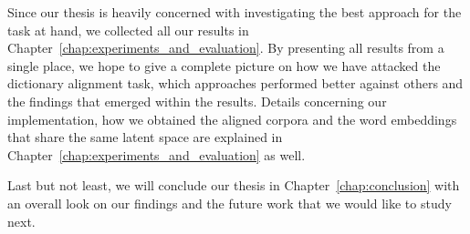 Since our thesis is heavily concerned with investigating the best approach for the task at hand, we collected all our results in Chapter~\ref{chap:experiments_and_evaluation}.
By presenting all results from a single place, we hope to give a complete picture on how we have attacked the dictionary alignment task, which approaches performed better against others and the findings that emerged within the results.
Details concerning our implementation, how we obtained the aligned corpora and the word embeddings that share the same latent space are explained in Chapter~\ref{chap:experiments_and_evaluation} as well.

Last but not least, we will conclude our thesis in Chapter~\ref{chap:conclusion} with an overall look on our findings and the future work that we would like to study next.
